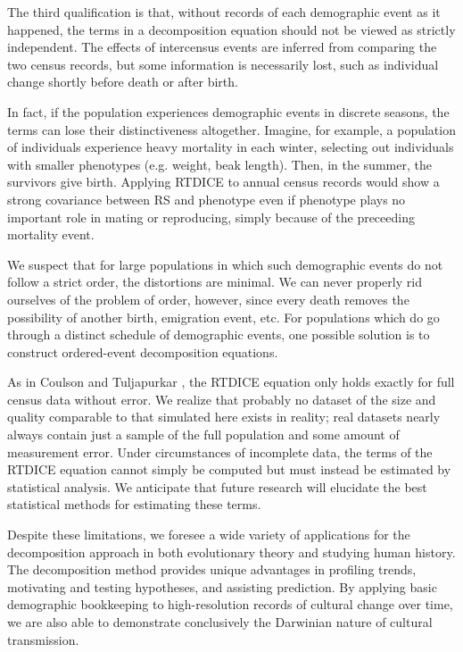 The third qualification is that, without records of each demographic event as it happened, the terms in a decomposition equation should not be viewed as strictly independent.  The effects of intercensus events are inferred from comparing the two census records, but some information is necessarily lost, such as individual change shortly before death or after birth. 

In fact, if the population experiences demographic events in discrete seasons, the terms can lose their distinctiveness altogether.  Imagine, for example, a population of individuals experience heavy mortality in each winter, selecting out individuals with smaller phenotypes (e.g. weight, beak length).  Then, in the summer, the survivors give birth.  Applying RTDICE to annual census records would show a strong covariance between RS and phenotype even if phenotype plays no important role in mating or reproducing, simply because of the preceeding mortality event.  

We suspect that for large populations in which such demographic events do not follow a strict order, the distortions are minimal.  We can never properly rid ourselves of the problem of order, however, since every death removes the possibility of another birth, emigration event, etc.  For populations which do go through a distinct schedule of demographic events, one possible solution is to construct ordered-event decomposition equations.  

As in Coulson and Tuljapurkar \citeyearpar{coulson2008dynamics}, the RTDICE equation only holds exactly for full census data without error. We realize that probably no dataset of the size and quality comparable to that simulated here exists in reality; real datasets nearly always contain just a sample of the full population and some amount of measurement error. Under circumstances of incomplete data, the terms of the RTDICE equation cannot simply be computed but must instead be estimated by statistical analysis. We anticipate that future research will elucidate the best statistical methods for estimating these terms.

Despite these limitations, we foresee a wide variety of applications for the decomposition approach in both evolutionary theory and studying human history.  The decomposition method provides unique advantages in profiling trends, motivating and testing hypotheses, and assisting prediction.  By applying basic demographic bookkeeping to high-resolution records of cultural change over time, we are also able to demonstrate conclusively the Darwinian nature of cultural transmission.    





